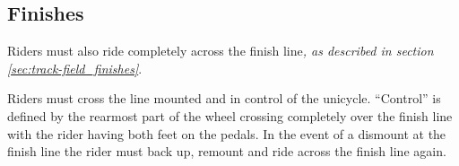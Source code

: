 \subsection{Finishes}

Riders must also ride completely across the finish line\textit{, as described in section \ref{sec:track-field_finishes}}. 

Riders must cross the line mounted and in control of the unicycle.
``Control'' is defined by the rearmost part of the wheel crossing completely over the finish line with the rider having both feet on the pedals.
In the event of a dismount at the finish line the rider must back up, remount and ride across the finish line again.
